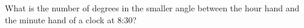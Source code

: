 What is the number of degrees in the smaller angle between the hour hand and the minute hand of a clock at 8:30?
